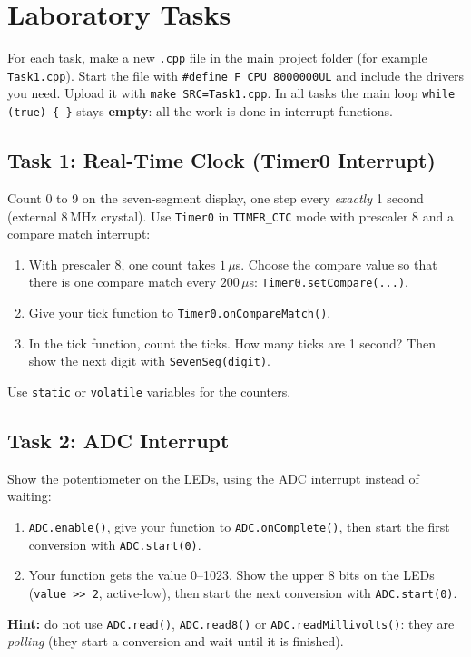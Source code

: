 \documentclass[11pt,a4paper]{article}
\newcommand{\code}[1]{\texttt{#1}}
\begin{document}
\newpage
\section{Laboratory Tasks}\vspace{-4pt}
\setlength{\parskip}{2pt}\setlength{\itemsep}{0pt}

For each task, make a new \code{.cpp} file in the main project folder (for
example \code{Task1.cpp}). Start the file with \code{\#define F\_CPU 8000000UL}
and include the drivers you need. Upload it with \code{make SRC=Task1.cpp}.
In all tasks the main loop \code{while (true) \{ \}} stays \textbf{empty}: all
the work is done in interrupt functions.

\subsection*{Task 1: Real-Time Clock (Timer0 Interrupt)}
Count 0 to 9 on the seven-segment display, one step every \emph{exactly} 1
second (external 8\,MHz crystal). Use \code{Timer0} in \code{TIMER\_CTC} mode
with prescaler 8 and a compare match interrupt:
\begin{enumerate}
  \item With prescaler 8, one count takes $1\,\mu$s. Choose the compare value so that
        there is one compare match every $200\,\mu$s:
        \code{Timer0.setCompare(...)}.
  \item Give your tick function to \code{Timer0.onCompareMatch()}.
  \item In the tick function, count the ticks. How many ticks are 1 second? Then show
        the next digit with \code{SevenSeg(digit)}.
\end{enumerate}
Use \code{static} or \code{volatile} variables for the counters.

\subsection*{Task 2: ADC Interrupt}
Show the potentiometer on the LEDs, using the ADC interrupt instead of waiting:
\begin{enumerate}
  \item \code{ADC.enable()}, give your function to \code{ADC.onComplete()}, then start the
        first conversion with \code{ADC.start(0)}.
  \item Your function gets the value 0--1023. Show the upper 8 bits on the LEDs
        (\code{value >{}> 2}, active-low), then start the next conversion with
        \code{ADC.start(0)}.
\end{enumerate}
\textbf{Hint:} do not use \code{ADC.read()}, \code{ADC.read8()} or
\code{ADC.readMillivolts()}: they are \emph{polling} (they start a conversion and
wait until it is finished).
\end{document}
